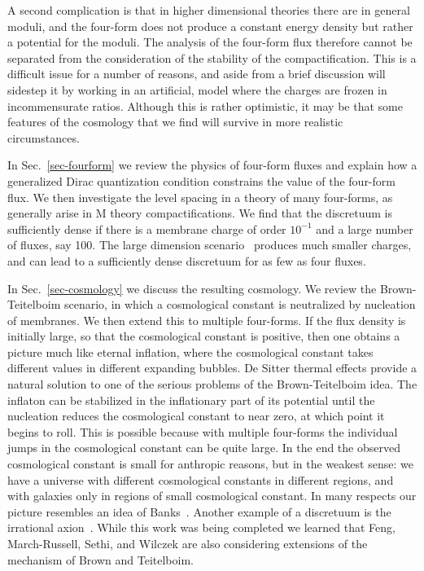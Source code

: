 \documentclass[12pt]{article}
\begin{document}
A second complication is that in higher dimensional theories there are
in general moduli, and the four-form does not produce a constant
energy density but rather a potential for the moduli.  The analysis of
the four-form flux therefore cannot be separated from the
consideration of the stability of the compactification.  This is a
difficult issue for a number of reasons, and aside from a brief
discussion will sidestep it by working in an artificial, model where
the charges are frozen in incommensurate ratios.  Although this is
rather optimistic, it may be that some features of the cosmology that
we find will survive in more realistic circumstances.

In Sec.~\ref{sec-fourform} we review the physics of four-form fluxes
and explain how a generalized Dirac quantization condition constrains
the value of the four-form flux.  We then investigate the level
spacing in a theory of many four-forms, as generally arise in M theory
compactifications.  We find that the discretuum is sufficiently dense
if there is a membrane charge of order $10^{-1}$ and a large number of
fluxes, say 100.  The large dimension scenario~\cite{ArkDim98}
produces much smaller charges, and can lead to a sufficiently dense
discretuum for as few as four fluxes.

In Sec.~\ref{sec-cosmology} we discuss the resulting cosmology.  We
review the Brown-Teitelboim scenario, in which a cosmological constant
is neutralized by nucleation of membranes.  We then extend this to
multiple four-forms.  If the flux density is initially large, so that
the cosmological constant is positive, then one obtains a picture much
like eternal inflation, where the cosmological constant takes
different values in different expanding bubbles.  De Sitter thermal
effects provide a natural solution to one of the serious problems of
the Brown-Teitelboim idea.  The inflaton can be stabilized in the
inflationary part of its potential until the nucleation reduces the
cosmological constant to near zero, at which point it begins to roll.
This is possible because with multiple four-forms the individual jumps
in the cosmological constant can be quite large.  In the end the
observed cosmological constant is small for anthropic reasons, but in
the weakest sense: we have a universe with different cosmological
constants in different regions, and with galaxies only in regions of
small cosmological constant.  In many respects our picture resembles
an idea of Banks~\cite{Ban86}.  Another example of a discretuum is the
irrational axion~\cite{BarEli83,BDS91}.  While this work was being
completed we learned that Feng, March-Russell, Sethi, and Wilczek are
also considering extensions of the mechanism of Brown and Teitelboim.
\end{document}
